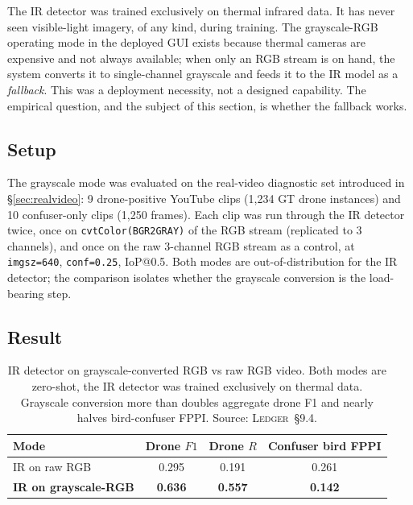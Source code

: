 \documentclass[12pt,a4paper,oneside,openright]{book}
\begin{document}
The IR detector was trained exclusively on thermal infrared data. It has never seen visible-light imagery, of any kind, during training. The grayscale-RGB operating mode in the deployed GUI exists because thermal cameras are expensive and not always available; when only an RGB stream is on hand, the system converts it to single-channel grayscale and feeds it to the IR model as a \emph{fallback}. This was a deployment necessity, not a designed capability. The empirical question, and the subject of this section, is whether the fallback works.

\subsection{Setup}

The grayscale mode was evaluated on the real-video diagnostic set introduced in \S\ref{sec:realvideo}: 9 drone-positive YouTube clips (1{,}234 GT drone instances) and 10 confuser-only clips (1{,}250 frames). Each clip was run through the IR detector twice, once on \texttt{cvtColor(BGR2GRAY)} of the RGB stream (replicated to 3 channels), and once on the raw 3-channel RGB stream as a control, at \texttt{imgsz=640}, \texttt{conf=0.25}, IoP@0.5. Both modes are out-of-distribution for the IR detector; the comparison isolates whether the grayscale conversion is the load-bearing step.

\subsection{Result}

\begin{table}[htbp]
    \centering
    \caption{IR detector on grayscale-converted RGB vs raw RGB video. Both modes are zero-shot, the IR detector was trained exclusively on thermal data. Grayscale conversion more than doubles aggregate drone F1 and nearly halves bird-confuser FPPI. Source: \textsc{Ledger}~\S9.4.}
    \label{tab:ir_grayscale}
    \begin{tabular}{lccc}
        \toprule
        Mode & Drone $F1$ & Drone $R$ & Confuser bird FPPI \\
        \midrule
        IR on raw RGB             & 0.295 & 0.191 & 0.261 \\
        \textbf{IR on grayscale-RGB} & \textbf{0.636} & \textbf{0.557} & \textbf{0.142} \\
        \bottomrule
    \end{tabular}
\end{table}
\end{document}
